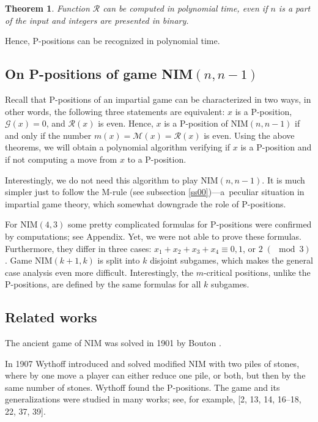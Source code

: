 \documentclass{article}
\newtheorem{theorem}{Theorem}
\theoremstyle{definition}
\def\G{\mathcal{G}}
\def\R{\mathcal{R}}
\def\M{\mathcal{M}}
\begin{document}
\begin{theorem}\label{th:complexity}
Function $\R$ can be computed in polynomial time, 
even if $n$  is a part of the input and integers are presented in binary.
\end{theorem}

Hence, P-positions can be recognized in polynomial time.

\subsection{On P-positions of game \boldmath NIM$(n,n-1)$} 
\label{ss05}
Recall that P-positions of an impartial game 
can be characterized in two ways, in other words,  
the following three statements are equivalent: 
$x$ is a P-position, $\G(x) = 0$, and $\R(x)$ is even. 
Hence, $x$  is a P-position of NIM$(n,n-1)$
if and only if the number $m(x) = \M(x) = \R(x)$  is even. 
Using the above theorems, we will obtain a 
polynomial algorithm verifying  
if  $x$  is a  P-position and if not 
computing a move from  $x$  to a P-position.   

Interestingly, 
we do not need this algorithm to play NIM$(n,n-1)$. 
It is much simpler just to follow the M-rule 
(see subsection \ref{ss00})---a~peculiar situation in impartial game theory, 
which somewhat downgrade the role of P-positions. 

\smallskip

For  NIM$(4,3)$ some pretty complicated formulas 
for P-positions were confirmed by computations; see Appendix. 
Yet, we  were not able to prove these formulas. 
Furthermore, they differ in three cases:
$x_1 + x_2 + x_3 + x_4 \equiv 0,1$, or $2 \; (\mod 3)$.
Game NIM$(k+1,k)$  is split into  $k$  disjoint subgames,  
which makes the general case analysis even more difficult. 
Interestingly, the $m$-critical positions, 
unlike the P-positions, are defined 
by the same formulas for all $k$  subgames.  

\subsection{Related works}
The ancient game of NIM was solved 
in 1901 by Bouton \cite{Bou901}. 

In 1907 Wythoff \cite{Wyt907} introduced and 
solved modified NIM 
with two piles of stones, where 
by one move a player can either reduce one pile, 
or both, but then by the same number of stones. 
Wythoff found the P-positions.
The game and its generalizations were studied 
in many works; see, for example, 
[2, 13, 14, 16–18, 22, 37, 39]. 
\end{document}
